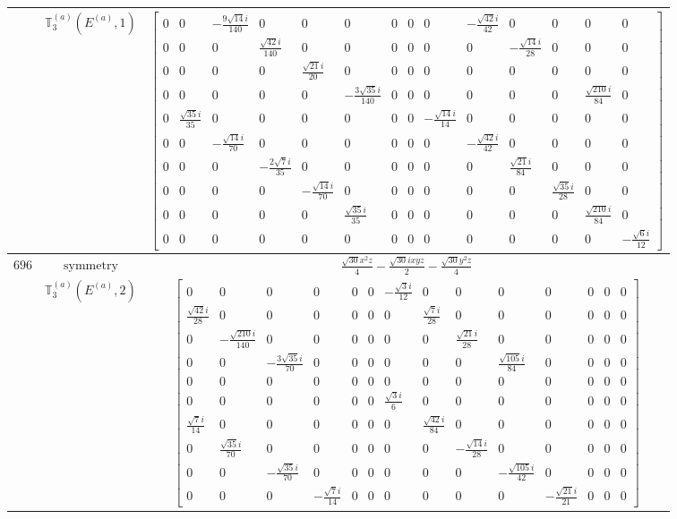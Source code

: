 \documentclass[fleqn,8pt,landscape]{jsarticle}
\begin{document}
\begin{longtable}{ccc}
$  $ & $ \mathbb{T}_{3}^{(a)}(E^{(a)},1) $ & $ \begin{bmatrix} 0 & 0 & - \frac{9 \sqrt{14} i}{140} & 0 & 0 & 0 & 0 & 0 & 0 & - \frac{\sqrt{42} i}{42} & 0 & 0 & 0 & 0 \\ 0 & 0 & 0 & \frac{\sqrt{42} i}{140} & 0 & 0 & 0 & 0 & 0 & 0 & - \frac{\sqrt{14} i}{28} & 0 & 0 & 0 \\ 0 & 0 & 0 & 0 & \frac{\sqrt{21} i}{20} & 0 & 0 & 0 & 0 & 0 & 0 & 0 & 0 & 0 \\ 0 & 0 & 0 & 0 & 0 & - \frac{3 \sqrt{35} i}{140} & 0 & 0 & 0 & 0 & 0 & 0 & \frac{\sqrt{210} i}{84} & 0 \\ 0 & \frac{\sqrt{35} i}{35} & 0 & 0 & 0 & 0 & 0 & 0 & - \frac{\sqrt{14} i}{14} & 0 & 0 & 0 & 0 & 0 \\ 0 & 0 & - \frac{\sqrt{14} i}{70} & 0 & 0 & 0 & 0 & 0 & 0 & - \frac{\sqrt{42} i}{42} & 0 & 0 & 0 & 0 \\ 0 & 0 & 0 & - \frac{2 \sqrt{7} i}{35} & 0 & 0 & 0 & 0 & 0 & 0 & \frac{\sqrt{21} i}{84} & 0 & 0 & 0 \\ 0 & 0 & 0 & 0 & - \frac{\sqrt{14} i}{70} & 0 & 0 & 0 & 0 & 0 & 0 & \frac{\sqrt{35} i}{28} & 0 & 0 \\ 0 & 0 & 0 & 0 & 0 & \frac{\sqrt{35} i}{35} & 0 & 0 & 0 & 0 & 0 & 0 & \frac{\sqrt{210} i}{84} & 0 \\ 0 & 0 & 0 & 0 & 0 & 0 & 0 & 0 & 0 & 0 & 0 & 0 & 0 & - \frac{\sqrt{6} i}{12} \end{bmatrix} $ \\ \hline
$ 696 $ & $ \text{symmetry} $ & $ \frac{\sqrt{30} x^{2} z}{4} - \frac{\sqrt{30} i x y z}{2} - \frac{\sqrt{30} y^{2} z}{4} $ \\
$  $ & $ \mathbb{T}_{3}^{(a)}(E^{(a)},2) $ & $ \begin{bmatrix} 0 & 0 & 0 & 0 & 0 & 0 & - \frac{\sqrt{3} i}{12} & 0 & 0 & 0 & 0 & 0 & 0 & 0 \\ \frac{\sqrt{42} i}{28} & 0 & 0 & 0 & 0 & 0 & 0 & \frac{\sqrt{7} i}{28} & 0 & 0 & 0 & 0 & 0 & 0 \\ 0 & - \frac{\sqrt{210} i}{140} & 0 & 0 & 0 & 0 & 0 & 0 & \frac{\sqrt{21} i}{28} & 0 & 0 & 0 & 0 & 0 \\ 0 & 0 & - \frac{3 \sqrt{35} i}{70} & 0 & 0 & 0 & 0 & 0 & 0 & \frac{\sqrt{105} i}{84} & 0 & 0 & 0 & 0 \\ 0 & 0 & 0 & 0 & 0 & 0 & 0 & 0 & 0 & 0 & 0 & 0 & 0 & 0 \\ 0 & 0 & 0 & 0 & 0 & 0 & \frac{\sqrt{3} i}{6} & 0 & 0 & 0 & 0 & 0 & 0 & 0 \\ \frac{\sqrt{7} i}{14} & 0 & 0 & 0 & 0 & 0 & 0 & \frac{\sqrt{42} i}{84} & 0 & 0 & 0 & 0 & 0 & 0 \\ 0 & \frac{\sqrt{35} i}{70} & 0 & 0 & 0 & 0 & 0 & 0 & - \frac{\sqrt{14} i}{28} & 0 & 0 & 0 & 0 & 0 \\ 0 & 0 & - \frac{\sqrt{35} i}{70} & 0 & 0 & 0 & 0 & 0 & 0 & - \frac{\sqrt{105} i}{42} & 0 & 0 & 0 & 0 \\ 0 & 0 & 0 & - \frac{\sqrt{7} i}{14} & 0 & 0 & 0 & 0 & 0 & 0 & - \frac{\sqrt{21} i}{21} & 0 & 0 & 0 \end{bmatrix} $ \\ \hline

\end{longtable}
\end{document}
